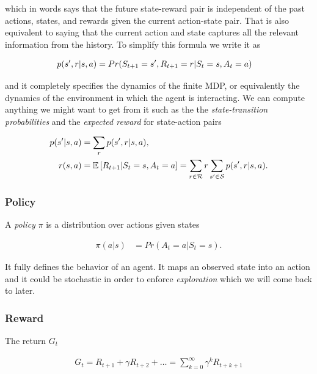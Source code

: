 \documentclass[result.tex]{subfiles}
\begin{document}
    which in words says that the future state-reward pair is independent of the past actions, states, and rewards given the current action-state pair. That is also equivalent to saying that the current action and state captures all the relevant information from the history. To simplify this formula we write it as

    \begin{align*}
        p(s^\prime, r | s, a) &=
        Pr(S_{t + 1} = s^\prime, R_{t + 1} = r | S_t = s, A_t = a)
    \end{align*}

    and it completely specifies the dynamics of the finite MDP, or equivalently the dynamics of the environment in which the agent is interacting. We can compute anything we might want to get from it such as the the \textit{state-transition probabilities} and the \textit{expected reward} for state-action pairs

    \begin{align*}
        p(s^\prime | s, a) &=
        \sum_r p(s^\prime, r | s, a), \\
        r(s, a) &=
        \mathbb{E} \left[ R_{t + 1} | S_t = s, A_t = a \right] =
        \sum_{r \in \mathcal{R}} r \sum_{s^\prime \in \mathcal{S}} p(s^\prime, r | s, a).
    \end{align*}

    \subsubsection*{Policy}

    A \textit{policy} $\pi$ is a distribution over actions given states

    \begin{align*}
        \pi(a | s) &= Pr(A_t = a | S_t = s).
    \end{align*}

    It fully defines the behavior of an agent. It maps an observed state into an action and it could be stochastic in order to enforce \textit{exploration} which we will come back to later.

    \subsubsection*{Reward}

    The return $G_t$

    \begin{align*}
        G_t = R_{t + 1} + \gamma R_{t + 2} + \ldots = \sum_{k = 0}^{\infty} \gamma^k R_{t + k + 1}
    \end{align*}
\end{document}
